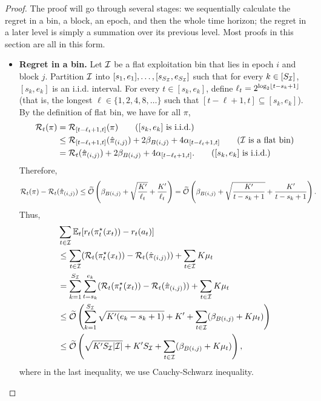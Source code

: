 \begin{proof}
The proof will go through several stages: we sequentially calculate the regret in a bin, a block, an epoch, and then the whole time horizon; the regret in a later level is simply a summation over its previous level. Most proofs in this section are all in this form. 
\begin{itemize}[leftmargin=*]
\item \textbf{Regret in a bin.} 
Let ${\mathcal{I}}$ be a flat exploitation bin that lies in epoch $i$ and block $j$. Partition ${\mathcal{I}}$ into $[s_1, e_1],\ldots, [s_{S_{\mathcal{I}}}, e_{S_{\mathcal{I}}}]$ such that for every $k\in[S_{\mathcal{I}}]$, $[s_k,e_k]$ is an i.i.d. interval. For every $t\in[s_k,e_k]$, define $\ell_t=2^{\log_2\lfloor t-s_k+1\rfloor}$ (that is, the longest $\ell\in\{1,2,4,8,\ldots\}$ such that $[t-\ell+1, t]\subseteq [s_k,e_k]$). By the definition of flat bin, we have for all $\pi$,
\begin{align*}
\calR_t(\pi)
&=\calR_{[t-\ell_t+1,t]}(\pi) \tag{$[s_k,e_k]$ is i.i.d.}\\
&\leq \calR_{[t-\ell_t+1,t]}(\hat{\pi}_{(i,j)}) + 2\beta_{B(i,j)}+4\alpha_{[t-\ell_t+1,t]} \tag{$\calI$ is a flat bin}\\
&=\calR_t(\hat{\pi}_{(i,j)}) + 2\beta_{B(i,j)}+4\alpha_{[t-\ell_t+1,t]}. \tag{$[s_k,e_k]$ is i.i.d.}
\end{align*}
Therefore, 
\begin{align*}
{\mathcal{R}}_t(\pi)-{\mathcal{R}}_t(\hat{\pi}_{(i,j)}) &\leq \widetilde{\mathcal{O}}\left(\beta_{B(i,j)}+\sqrt{\frac{K'}{\ell_t}} + \frac{K'}{\ell_t}\right) 
= \widetilde{\mathcal{O}}\left(\beta_{B(i,j)}+\sqrt{\frac{K'}{t-s_k+1}} + \frac{K'}{t-s_k+1}\right). 
\end{align*}
Thus, 
\begin{align*}
&\sum_{t \in {\mathcal{I}}} \mathbb{E}_t[ r_t(\pi^\star_t(x_t)) - r_t(a_t)] \\
&\leq \sum_{t \in {\mathcal{I}}} ({\mathcal{R}}_t(\pi^\star_t(x_t)) - {\mathcal{R}}_t(\hat{\pi}_{(i,j)})) + \sum_{t \in {\mathcal{I}}} K\mu_t \\
&=\sum_{k=1}^{S_{\mathcal{I}}} \sum_{t=s_k}^{e_k}({\mathcal{R}}_t(\pi^\star_t(x_t)) - {\mathcal{R}}_t(\hat{\pi}_{(i,j)})) + \sum_{t \in {\mathcal{I}}} K\mu_t \\
&\leq \widetilde{\mathcal{O}}\left(\sum_{k=1}^{S_{\mathcal{I}}} \sqrt{K'(e_k-s_k+1)} + K' + \sum_{t\in{\mathcal{I}}} (\beta_{B(i,j)} + K\mu_t) \right) \\
& \leq \widetilde{\mathcal{O}}\left(\sqrt{K'S_{\mathcal{I}}\lvert{\mathcal{I}}\rvert} + K'S_{\mathcal{I}} + \sum_{t\in{\mathcal{I}}} (\beta_{B(i,j)} + K\mu_t) \right), 
\end{align*}
where in the last inequality, we use Cauchy-Schwarz inequality. 


\end{itemize}
\end{proof}
